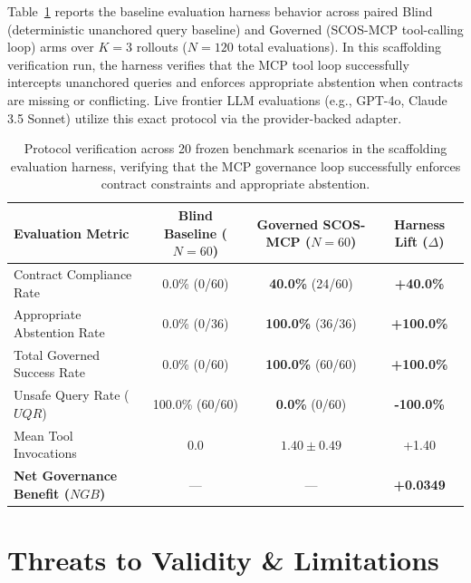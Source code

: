 \documentclass[11pt,a4paper]{article}
\begin{document}
Table~\ref{tab:empirical_scorecard} reports the baseline evaluation harness behavior across paired Blind (deterministic unanchored query baseline) and Governed (SCOS-MCP tool-calling loop) arms over $K=3$ rollouts ($N=120$ total evaluations). In this scaffolding verification run, the harness verifies that the MCP tool loop successfully intercepts unanchored queries and enforces appropriate abstention when contracts are missing or conflicting. Live frontier LLM evaluations (e.g., GPT-4o, Claude 3.5 Sonnet) utilize this exact protocol via the provider-backed adapter.


\begin{table}[ht!]
\centering
\small
\begin{tabular}{lccc}
\toprule
\textbf{Evaluation Metric} & \textbf{Blind Baseline ($N=60$)} & \textbf{Governed SCOS-MCP ($N=60$)} & \textbf{Harness Lift ($\Delta$)} \\
\midrule
Contract Compliance Rate & 0.0\% (0/60) & \textbf{40.0\%} (24/60) & \textbf{+40.0\%} \\
Appropriate Abstention Rate & 0.0\% (0/36) & \textbf{100.0\%} (36/36) & \textbf{+100.0\%} \\
Total Governed Success Rate & 0.0\% (0/60) & \textbf{100.0\%} (60/60) & \textbf{+100.0\%} \\
Unsafe Query Rate ($UQR$) & 100.0\% (60/60) & \textbf{0.0\%} (0/60) & \textbf{-100.0\%} \\
Mean Tool Invocations & 0.0 & $1.40 \pm 0.49$ & +1.40 \\
\textbf{Net Governance Benefit ($NGB$)} & — & — & \textbf{+0.0349} \\
\bottomrule
\end{tabular}
\caption{Protocol verification across 20 frozen benchmark scenarios in the scaffolding evaluation harness, verifying that the MCP governance loop successfully enforces contract constraints and appropriate abstention.}
\label{tab:empirical_scorecard}
\end{table}

\section{Threats to Validity \& Limitations}
\label{sec:threats}
\end{document}
